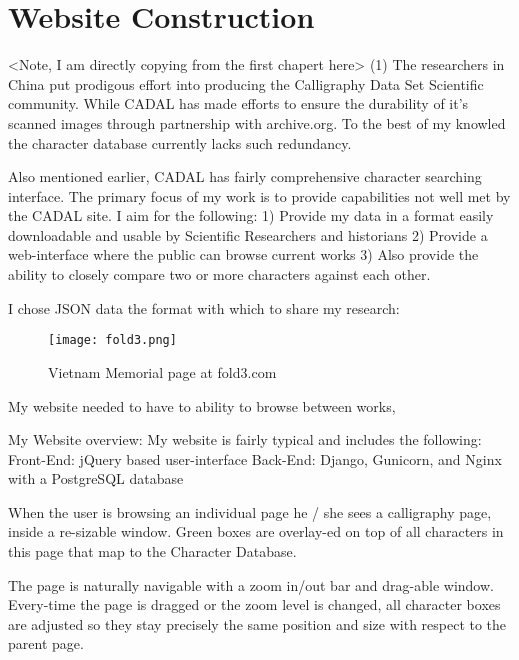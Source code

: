 \chapter{Website Construction}

    <Note, I am directly copying from the first chapert here>
    (1)  The researchers in China put prodigous effort into producing the Calligraphy Data Set Scientific community.  While CADAL has made efforts to ensure the durability of it's scanned images through partnership with archive.org.  To the best of my knowled the character database currently lacks such redundancy.
    
    Also mentioned earlier, CADAL has fairly comprehensive character searching interface.  The primary focus of my work is to provide capabilities not well met by the CADAL site.  I aim for the following:
    1)  Provide my data in a format easily downloadable and usable by Scientific Researchers and historians
    2)  Provide a web-interface where the public can browse current works
    3)  Also provide the ability to closely compare two or more characters against each other.
    
    I chose JSON data the format with which to share my research:
    
    
    
    
    
    
    \begin{figure}{}
    \parbox{12cm}{\texttt{[image: fold3.png]}}
    \caption{Vietnam Memorial page at fold3.com}
    \label{Vietnam Memorial inspiration}
    \end{figure}
    
    My website needed to have to ability to browse between works, 
    
        My Website overview:
            My website is fairly typical and includes the following:
                Front-End:  jQuery based user-interface
                Back-End:   Django, Gunicorn, and Nginx with a PostgreSQL database
                
            When the user is browsing an individual page he / she sees a calligraphy page, inside a re-sizable window.
                Green boxes are overlay-ed on top of all characters in this page that map to the Character Database.
                
                The page is naturally navigable with a zoom in/out bar and drag-able window.
                Every-time the page is dragged or the zoom level is changed, all character boxes are adjusted so they stay precisely the same position and size with respect to the parent page.
                
